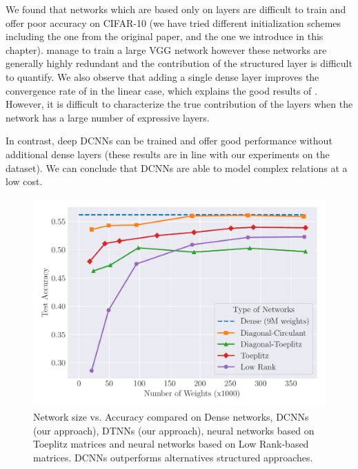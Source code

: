 We found that networks which are based only on \ACDC layers are difficult to train and offer poor accuracy on CIFAR-10 (we have tried different initialization schemes including the one from the original paper, and the one we introduce in this chapter).
\citet{moczulski2016acdc} manage to train a large VGG network  however these networks are generally highly redundant and the contribution of the structured layer is difficult to quantify. 
We also observe that adding a single dense layer improves the convergence rate of \ACDC in the linear case, which explains the good results of \citet{moczulski2016acdc}.
However, it is difficult to characterize the true contribution of the \ACDC layers when the network has a large number of expressive layers.

In contrast, deep DCNNs can be trained and offer good performance without additional dense layers (these results are in line with our experiments on the \yt dataset).
We can conclude that DCNNs are able to model complex relations at a low cost. 

%    


\begin{figure}
   \centering
   \includegraphics[width=\scalefigure\textwidth]{figures/main/ch4-diagonal_circulant/cifar10_type.pdf}
   \caption{Network size vs. Accuracy compared on Dense networks, DCNNs (our approach), DTNNs (our approach), neural networks based on Toeplitz matrices and neural networks based on Low Rank-based matrices. DCNNs outperforms alternatives structured approaches.}
   \label{figure:ch4-cifar10_type}
\end{figure}



